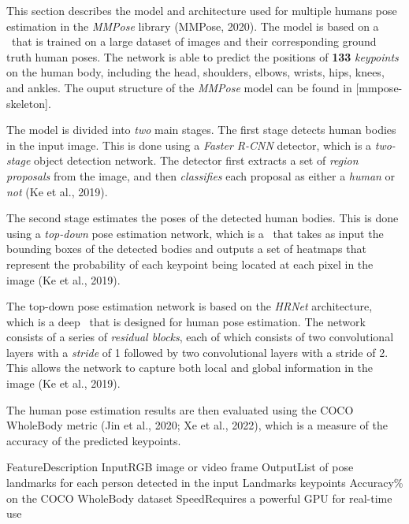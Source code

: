 This section describes the model and architecture used for multiple humans pose estimation in the {\em MMPose} library (\scc MMPose, 2020). The model is based on a \CNN\ that is trained on a large dataset of images and their corresponding ground truth human poses. The network is able to predict the positions of {\bf 133} {\em keypoints} on the human body, including the head, shoulders, elbows, wrists, hips, knees, and ankles. The ouput structure of the {\em MMPose} model can be found in [mmpose-skeleton].

The model is divided into {\em two} main stages. The first stage detects human bodies in the input image. This is done using a {\em Faster R-CNN} detector, which is a {\em two-stage} object detection network. The detector first extracts a set of {\em region proposals} from the image, and then {\em classifies} each proposal as either a {\em human} or {\em not} (\scc Ke et al., 2019).

The second stage estimates the poses of the detected human bodies. This is done using a {\em top-down} pose estimation network, which is a \CNN\ that takes as input the bounding boxes of the detected bodies and outputs a set of heatmaps that represent the probability of each keypoint being located at each pixel in the image (\scc Ke et al., 2019).

The top-down pose estimation network is based on the {\em HRNet} architecture, which is a deep \CNN\ that is designed for human pose estimation. The network consists of a series of {\em residual blocks}, each of which consists of two convolutional layers with a {\em stride} of 1 followed by two convolutional layers with a stride of 2. This allows the network to capture both local and global information in the image (\scc Ke et al., 2019).

The human pose estimation results are then evaluated using the COCO WholeBody metric (\scc Jin et al., 2020; \scc Xe et al., 2022), which is a measure of the accuracy of the predicted keypoints.

    \setupTABLE[r][1][style=bold]
    \setupTABLE[c][each][offset=3dd]
    \setupTABLE[frame=off]
    \setupTABLE[r][1][topframe=on,bottomframe=on]
    \setupTABLE[c][each][leftframe=on]
    \setupTABLE[c][1][leftframe=off]
    \bTR
        \bTD Feature\eTD\bTD    Description\eTD\eTR
    \bTR
        \bTD Input\eTD\bTD	    RGB image or video frame\eTD\eTR
    \bTR
        \bTD Output\eTD\bTD	    List of pose landmarks for each person detected in the input\eTD\eTR
    \bTR
        \bTD Landmarks\eTD{} keypoints\eTD\eTR
    \bTR
        \bTD Accuracy\eTD{}\% on the COCO WholeBody dataset\eTD\eTR
    \bTR
        \bTD Speed\eTD\bTD	    Requires a powerful GPU for real-time use\eTD\eTR

